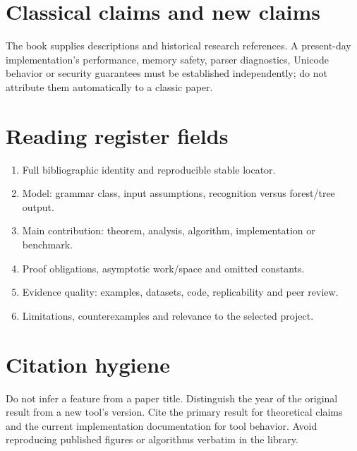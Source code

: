 \documentclass[11pt,letterpaper]{article}
\begin{document}
\makedoctitle\makedocsummary
\tableofcontents\clearpage
\section{Classical claims and new claims}
The book supplies descriptions and historical research references. A present-day implementation's performance, memory safety, parser diagnostics, Unicode behavior or security guarantees must be established independently; do not attribute them automatically to a classic paper.
\section{Reading register fields}
\begin{enumerate}\item Full bibliographic identity and reproducible stable locator.\item Model: grammar class, input assumptions, recognition versus forest/tree output.\item Main contribution: theorem, analysis, algorithm, implementation or benchmark.\item Proof obligations, asymptotic work/space and omitted constants.\item Evidence quality: examples, datasets, code, replicability and peer review.\item Limitations, counterexamples and relevance to the selected project.\end{enumerate}
\section{Citation hygiene}
Do not infer a feature from a paper title. Distinguish the year of the original result from a new tool's version. Cite the primary result for theoretical claims and the current implementation documentation for tool behavior. Avoid reproducing published figures or algorithms verbatim in the library.
\end{document}
